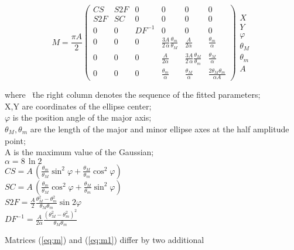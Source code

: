 \begin{equation}
M = \frac{\pi A}{2}
\left(
\begin{array}{cccccc}
CS  & S2F & 0 & 0 & 0 & 0 \\
S2F & SC  & 0 & 0 & 0 & 0 \\
0 & 0 & DF^{-1} & 0 & 0 & 0 \\
0 & 0 & 0 & \frac{3A}{2\,\alpha} \frac{\theta_m}{\theta_M}
  & \frac{A}{2\alpha} & \frac{\theta_m}{\alpha}\\
0 & 0 & 0 & \frac{A}{2\alpha} & \frac{3A}{2\,\alpha} \frac{\theta_M}{\theta_m}
   & \frac{\theta_M}{\alpha}\\
0 & 0 & 0 & \frac{\theta_m}{\alpha} & \frac{\theta_M}{\alpha}
  &  \frac{2 \theta_M \theta_m}{\alpha A}
\end{array}
\right)
\begin{array}{c}
X \\ Y \\ \varphi \\ \theta_M\\ \theta_m\\ A
\end{array}
\label{eq:m1}
\end{equation}
\begin{tabbing}
where~
\=the right column denotes the sequence of the fitted parameters;\\
\> X,Y are coordinates of the ellipse center;\\
\> $\varphi$ is the position angle of the major axis;\\
\> $\theta_M, \theta_m$ are the length of the major and minor ellipse axes at the half amplitude point;\\
\> A is the maximum value of the Gaussian; \\
\> $\alpha = 8\,\ln 2$\\
\> $CS = A\, \left(\frac{\theta_m}{\theta_M} \sin^2 \varphi +
   \frac{\theta_M}{\theta_m} \cos^2 \varphi \right)$\\
\> $SC = A\, \left(\frac{\theta_m}{\theta_M} \cos^2 \varphi +
   \frac{\theta_M}{\theta_m} \sin^2 \varphi \right)$\\
\> $S2F = \frac{A}{2}  \frac{\theta_M^2 - \theta_m^2}
   {\theta_M \theta_m} \sin 2\varphi$\\
\> $DF^{-1} = \frac{A}{2 \alpha} \frac{\left(\theta_M^2 - \theta_m^2\right)^2}
   {\theta_M \theta_m}$\\
\end{tabbing}
Matrices (\ref{eq:m}) and (\ref{eq:m1}) differ by two additional

